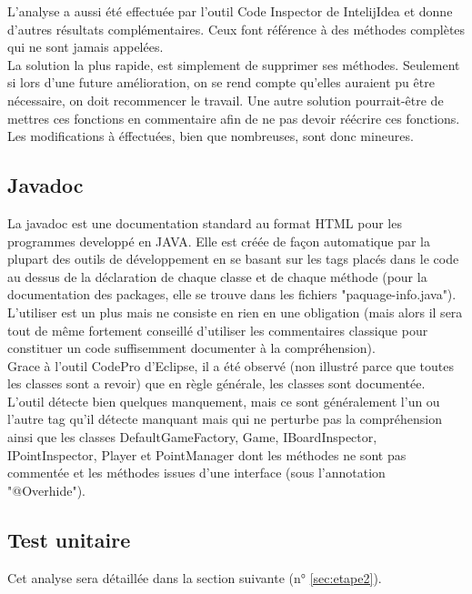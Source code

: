\documentclass[12pt,a4paper,final]{article}
\begin{document}
L'analyse a aussi été effectuée par l'outil Code Inspector de IntelijIdea et donne d'autres résultats complémentaires. Ceux font référence à des méthodes complètes qui ne sont jamais appelées.\\
La solution la plus rapide, est simplement de supprimer ses méthodes. Seulement si lors d'une future amélioration, on se rend compte qu'elles auraient pu être nécessaire, on doit recommencer le travail. Une autre solution pourrait-être de mettres ces fonctions en commentaire afin de ne pas devoir réécrire ces fonctions.\\
Les modifications à éffectuées, bien que nombreuses, sont donc mineures.

\subsection{Javadoc}\label{javadoc}
La javadoc est une documentation standard au format HTML pour les programmes developpé en JAVA. Elle est créée de façon automatique par la plupart des outils de développement en se basant sur les tags placés dans le code au dessus de la déclaration de chaque classe et de chaque méthode (pour la documentation des packages, elle se trouve dans les fichiers "paquage-info.java").
L'utiliser est un plus mais ne consiste en rien en une obligation (mais alors il sera tout de même fortement conseillé d'utiliser les commentaires classique pour constituer un code suffisemment documenter à la compréhension).\\
Grace à l'outil CodePro d'Eclipse, il a été observé (non illustré parce que toutes les classes sont a revoir) que en règle générale, les classes sont documentée. L'outil détecte bien quelques manquement, mais ce sont généralement l'un ou l'autre tag qu'il détecte manquant mais qui ne perturbe pas la compréhension ainsi que les classes DefaultGameFactory, Game, IBoardInspector, IPointInspector, Player et PointManager dont les méthodes ne sont pas commentée et les méthodes issues d'une interface (sous l'annotation "@Overhide").

\subsection{Test unitaire}
Cet analyse sera détaillée dans la section suivante (n$°$ \ref{sec:etape2}).
\end{document}
